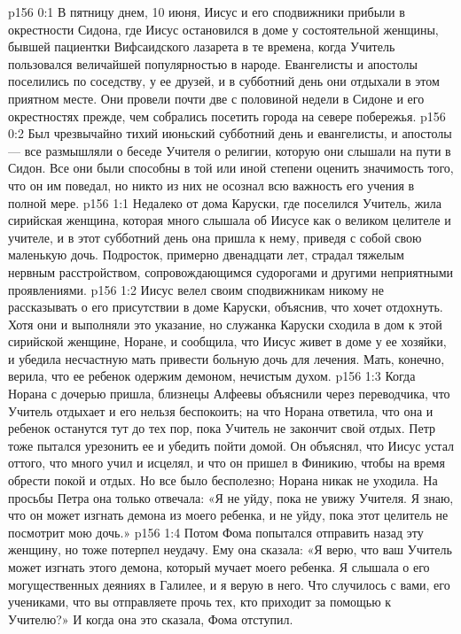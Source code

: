 \author{Комиссия срединников}
\vs p156 0:1 В пятницу днем, 10 июня, Иисус и его сподвижники прибыли в окрестности Сидона, где Иисус остановился в доме у состоятельной женщины, бывшей пациентки Вифсаидского лазарета в те времена, когда Учитель пользовался величайшей популярностью в народе. Евангелисты и апостолы поселились по соседству, у ее друзей, и в субботний день они отдыхали в этом приятном месте. Они провели почти две с половиной недели в Сидоне и его окрестностях прежде, чем собрались посетить города на севере побережья.
\vs p156 0:2 Был чрезвычайно тихий июньский субботний день и евангелисты, и апостолы --- все размышляли о беседе Учителя о религии, которую они слышали на пути в Сидон. Все они были способны в той или иной степени оценить значимость того, что он им поведал, но никто из них не осознал всю важность его учения в полной мере.
\vs p156 1:1 Недалеко от дома Каруски, где поселился Учитель, жила сирийская женщина, которая много слышала об Иисусе как о великом целителе и учителе, и в этот субботний день она пришла к нему, приведя с собой свою маленькую дочь. Подросток, примерно двенадцати лет, страдал тяжелым нервным расстройством, сопровождающимся судорогами и другими неприятными проявлениями.
\vs p156 1:2 Иисус велел своим сподвижникам никому не рассказывать о его присутствии в доме Каруски, объяснив, что хочет отдохнуть. Хотя они и выполняли это указание, но служанка Каруски сходила в дом к этой сирийской женщине, Норане, и сообщила, что Иисус живет в доме у ее хозяйки, и убедила несчастную мать привести больную дочь для лечения. Мать, конечно, верила, что ее ребенок одержим демоном, нечистым духом.
\vs p156 1:3 Когда Норана с дочерью пришла, близнецы Алфеевы объяснили через переводчика, что Учитель отдыхает и его нельзя беспокоить; на что Норана ответила, что она и ребенок останутся тут до тех пор, пока Учитель не закончит свой отдых. Петр тоже пытался урезонить ее и убедить пойти домой. Он объяснял, что Иисус устал оттого, что много учил и исцелял, и что он пришел в Финикию, чтобы на время обрести покой и отдых. Но все было бесполезно; Норана никак не уходила. На просьбы Петра она только отвечала: «Я не уйду, пока не увижу Учителя. Я знаю, что он может изгнать демона из моего ребенка, и не уйду, пока этот целитель не посмотрит мою дочь.»
\vs p156 1:4 Потом Фома попытался отправить назад эту женщину, но тоже потерпел неудачу. Ему она сказала: «Я верю, что ваш Учитель может изгнать этого демона, который мучает моего ребенка. Я слышала о его могущественных деяниях в Галилее, и я верую в него. Что случилось с вами, его учениками, что вы отправляете прочь тех, кто приходит за помощью к Учителю?» И когда она это сказала, Фома отступил.
